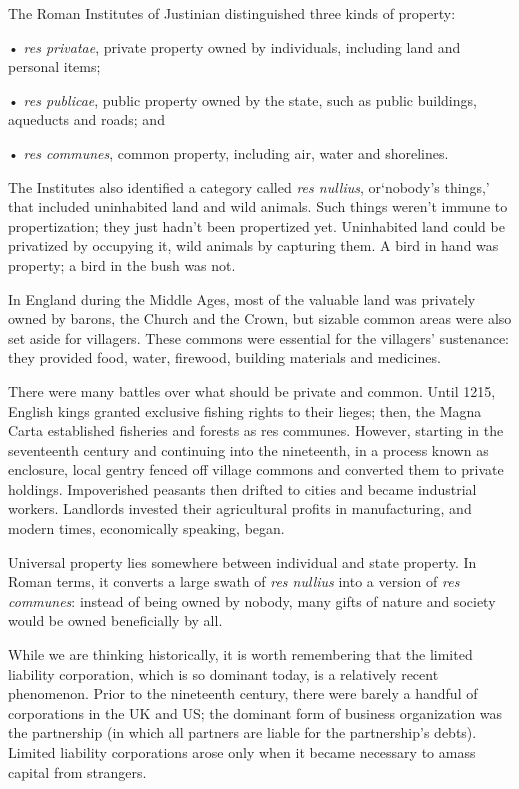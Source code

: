\documentclass[
]{book}
\begin{document}
The Roman Institutes of Justinian distinguished three kinds of property:

• \emph{res privatae}, private property owned by individuals, including land and personal items;

• \emph{res publicae}, public property owned by the state, such as public buildings, aqueducts and roads; and

• \emph{res communes}, common property, including air, water and shore­lines.

The Institutes also identified a category called \emph{res nullius}, or`nobody's things,' that included uninhabited land and wild animals. Such things weren't immune to propertization; they just hadn't been pro­pertized yet. Uninhabited land could be privatized by occupying it, wild ani­mals by capturing them. A bird in hand was property; a bird in the bush was not.

In England during the Middle Ages, most of the valuable land was pri­vately owned by barons, the Church and the Crown, but sizable com­mon areas were also set aside for villagers. These commons were essential for the villagers'­ sustenance: they provided food, water, fire­wood, building materials and medicines.

There were many battles over what should be private and common. Until 1215, English kings granted exclusive fishing rights to their lieges; then, the Magna Carta established fisheries and forests as res communes. How­ever, starting in the seventeenth century and continuing into the nine­teenth, in a process known as enclosure, local gentry fenced off village commons and converted them to private holdings. Impover­ished peasants then drifted to cities and became industrial workers. Land­lords invested their agricultural profits in manufacturing, and modern times, economically speaking, began.

Universal property lies somewhere between individual and state property. In Roman terms, it converts a large swath of \emph{res nullius} into a version of \emph{res communes}: instead of being owned by nobody, many gifts of nature and society would be owned beneficially by all.

While we are thinking historically, it is worth remembering that the limited liability corporation, which is so dominant today, is a relatively recent phenomenon. Prior to the nineteenth century, there were barely a handful of corporations in the UK and US; the dominant form of busi­ness organization was the partnership (in which all partners are liable for the partnership's debts). Limited liability corporations arose only when it became necessary to amass capital from strangers.
\end{document}
